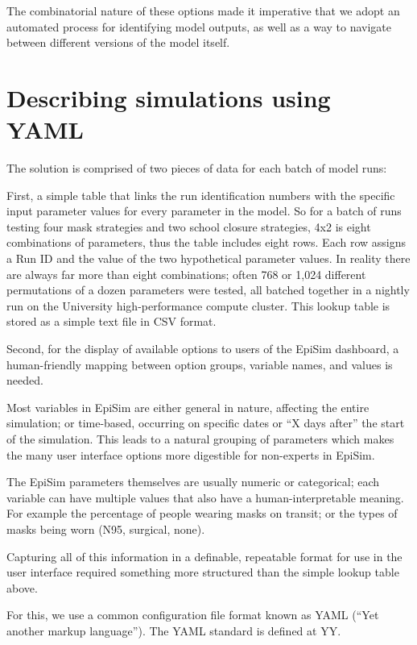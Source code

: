 The combinatorial nature of these options made it imperative that we adopt an automated process for identifying model outputs, as well as a way to navigate between different versions of the model itself.

\hypertarget{describing-simulations-using-yaml}{%
\section{Describing simulations using YAML}\label{describing-simulations-using-yaml}}

The solution is comprised of two pieces of data for each batch of model runs:

First, a simple table that links the run identification numbers with the specific input parameter values for every parameter in the model. So for a batch of runs testing four mask strategies and two school closure strategies, 4x2 is eight combinations of parameters, thus the table includes eight rows. Each row assigns a Run ID and the value of the two hypothetical parameter values. In reality there are always far more than eight combinations; often 768 or 1,024 different permutations of a dozen parameters were tested, all batched together in a nightly run on the University high-performance compute cluster. This lookup table is stored as a simple text file in CSV format.

Second, for the display of available options to users of the EpiSim dashboard, a human-friendly mapping between option groups, variable names, and values is needed.

Most variables in EpiSim are either general in nature, affecting the entire simulation; or time-based, occurring on specific dates or ``X days after'' the start of the simulation. This leads to a natural grouping of parameters which makes the many user interface options more digestible for non-experts in EpiSim.

The EpiSim parameters themselves are usually numeric or categorical; each variable can have multiple values that also have a human-interpretable meaning. For example the percentage of people wearing masks on transit; or the types of masks being worn (N95, surgical, none).

Capturing all of this information in a definable, repeatable format for use in the user interface required something more structured than the simple lookup table above.

For this, we use a common configuration file format known as YAML (``Yet another markup language''). The YAML standard is defined at YY.

